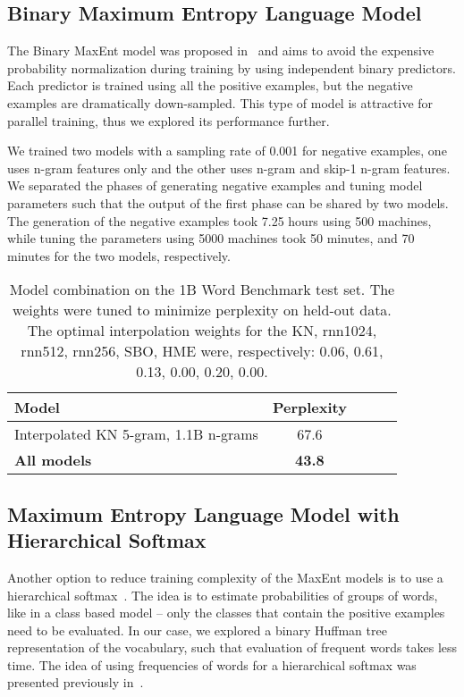 \documentclass[11pt,letterpaper]{article}
\begin{document}
\subsection{Binary Maximum Entropy Language Model}

The Binary MaxEnt model was proposed in~\cite{Xu:2011} and aims to avoid the expensive probability
normalization during training by using independent binary predictors. Each predictor
is trained using all the positive examples, but the negative examples are dramatically down-sampled.
This type of model is attractive for parallel training, thus we explored its performance further.

We trained two models with a sampling rate of 0.001 for negative examples, one uses n-gram features only
and the other uses n-gram and skip-1 n-gram features. We separated the phases of generating negative
examples and tuning model parameters such that the output of the first phase can be shared by two
models. The generation of the negative examples took 7.25 hours using
500 machines, while tuning the parameters using 5000 machines took 50 minutes, and 70 minutes for
the two models, respectively.

\begin{table*}
\begin{center}
\begin{tabular}{|l|c|c|c|c|}
\hline
\bf Model                           & \bf Perplexity \\
\hline
Interpolated KN 5-gram, 1.1B n-grams& 67.6           \\
\hline
\bf All models                      &\bf 43.8        \\
\hline
\end{tabular}
\end{center}
\caption{\label{combination-table}Model combination on the 1B Word Benchmark test set. The weights were tuned to minimize perplexity on held-out data. The optimal interpolation weights for the KN, rnn1024, rnn512, rnn256, SBO, HME were, respectively: 0.06, 0.61, 0.13, 0.00, 0.20, 0.00.}
\end{table*}

\subsection{Maximum Entropy Language Model with Hierarchical Softmax}

Another option to reduce training complexity of the MaxEnt models is to use a hierarchical
softmax~\cite{Goodman:2001b,Morin:2005}.
The idea is to estimate probabilities of groups of words, like in a class based model -- only the
classes that contain the positive examples need to be evaluated. In our case, we explored a
binary Huffman tree representation of the vocabulary, such that evaluation of
frequent words takes less time. The idea of using frequencies of words
for a hierarchical softmax was presented previously in~\cite{Mikolov:2011a}.
\end{document}
